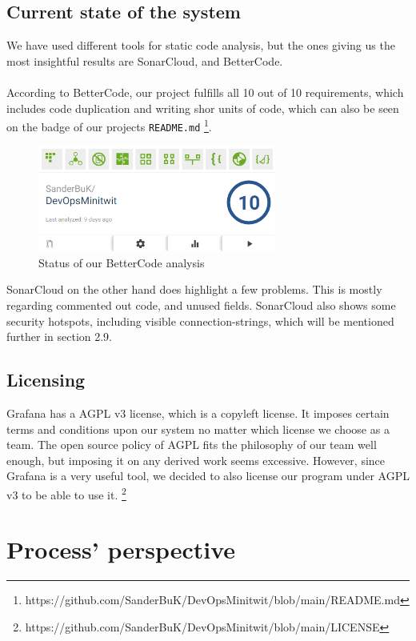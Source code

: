 \documentclass{article}
\begin{document}
\subsection{Current state of the system}
We have used different tools for static code analysis, but the ones giving us the most insightful results are SonarCloud, and BetterCode.
\\\\
According to BetterCode, our project fulfills all 10 out of 10 requirements, which includes code duplication and writing shor units of code, which can also be seen on the badge of our projects \verb|README.md| \footnote{https://github.com/SanderBuK/DevOpsMinitwit/blob/main/README.md}.
\begin{figure}[h]
    \centering
    \includegraphics[width=0.7\textwidth]{images/bettercode.png}
    \caption{Status of our BetterCode analysis}
\end{figure}

SonarCloud on the other hand does highlight a few problems. This is mostly regarding commented out code, and unused fields. SonarCloud also shows some security hotspots, including visible connection-strings, which will be mentioned further in section 2.9.

\subsection{Licensing}
Grafana has a AGPL v3 license, which is a copyleft license. It imposes certain terms and conditions upon our system no matter which license we choose as a team. The open source policy of AGPL fits the philosophy of our team well enough, but imposing it on any derived work seems excessive. However, since Grafana is a very useful tool, we decided to also license our program under AGPL v3 to be able to use it. \footnote{https://github.com/SanderBuK/DevOpsMinitwit/blob/main/LICENSE}


\section{Process' perspective}
\end{document}
